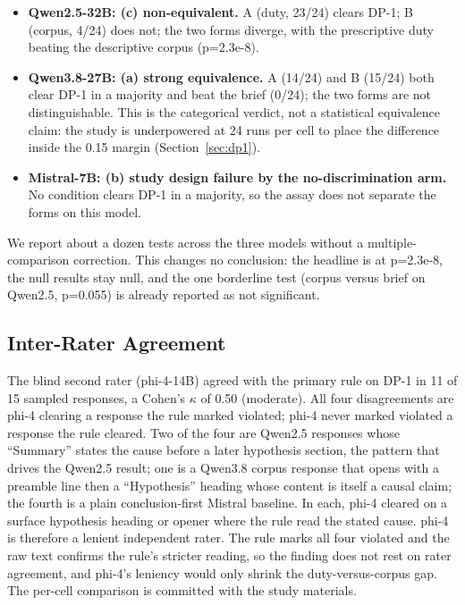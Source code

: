 \documentclass[11pt,a4paper]{article}
\begin{document}
\begin{itemize}
  \item \textbf{Qwen2.5-32B: (c) non-equivalent.} A (duty, 23/24) clears DP-1; B (corpus,
    4/24) does not; the two forms diverge, with the prescriptive duty beating the
    descriptive corpus (p=2.3e-8).
  \item \textbf{Qwen3.8-27B: (a) strong equivalence.} A (14/24) and B (15/24) both clear
    DP-1 in a majority and beat the brief (0/24); the two forms are not distinguishable.
    This is the categorical verdict, not a statistical equivalence claim: the study is
    underpowered at 24 runs per cell to place the difference inside the 0.15 margin
    (Section~\ref{sec:dp1}).
  \item \textbf{Mistral-7B: (b) study design failure by the no-discrimination arm.} No
    condition clears DP-1 in a majority, so the assay does not separate the forms on this
    model.
\end{itemize}

We report about a dozen tests across the three models without a multiple-comparison
correction. This changes no conclusion: the headline is at p=2.3e-8, the null results stay
null, and the one borderline test (corpus versus brief on Qwen2.5, p=0.055) is already
reported as not significant.

\subsection{Inter-Rater Agreement}\label{sec:irr}

The blind second rater (phi-4-14B) agreed with the primary rule on DP-1 in 11 of 15
sampled responses, a Cohen's $\kappa$ of 0.50 (moderate). All four disagreements are
phi-4 clearing a response the rule marked violated; phi-4 never marked violated a response
the rule cleared. Two of the four are Qwen2.5 responses whose ``Summary'' states the cause
before a later hypothesis section, the pattern that drives the Qwen2.5 result; one is a
Qwen3.8 corpus response that opens with a preamble line then a ``Hypothesis'' heading
whose content is itself a causal claim; the fourth is a plain conclusion-first Mistral baseline. In each, phi-4
cleared on a surface hypothesis heading or opener where the rule read the stated cause.
phi-4 is therefore a lenient independent rater. The rule marks all four violated and the
raw text confirms the rule's stricter reading, so the finding does not rest on rater
agreement, and phi-4's leniency would only shrink the duty-versus-corpus gap. The per-cell comparison is
committed with the study materials.
\end{document}
